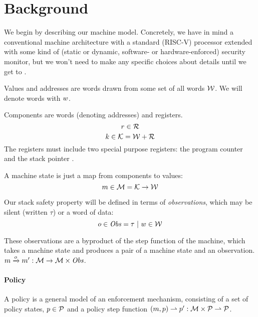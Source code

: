 \documentclass[acmsmall,review,anonymous]{acmart}\settopmatter{printfolios=true,printccs=false,printacmref=false}
\begin{document}
\section{Background}
\label{sec:prelim}

We begin by describing our machine model. Concretely, we have in mind a
conventional machine architecture with a standard (RISC-V) processor
extended with some kind of (static or dynamic, software- or
hardware-enforced) security monitor, but we won't need to make any
specific choices about details until we get to .

Values and addresses are words drawn from some set of all words ${\mathcal W}$. We will
denote words with $w$.

Components are words (denoting addresses) and registers.
%
    \[r \in {\mathcal R}\]
    \[k \in {\mathcal K} = {\mathcal W} + {\mathcal R} \]
%
The registers must include two special purpose registers: the program
counter \PCname and the stack pointer \SP.

A machine state is just a map from components to values:
%
\[m \in {\mathcal M} = {\mathcal K} \rightarrow {\mathcal W}\]


Our stack safety property will be defined in terms of {\em observations}, which may be
silent (written $\tau$) or a word of data:
%
\[o \in \mathit{Obs} = \tau ~ | ~ w \in {\mathcal W}\]

These observations are a byproduct of the step function of the
machine, which takes a machine state and produces a pair of a
machine state and an observation.
%
\(m \xrightarrow{o} m' : {\mathcal M} \rightarrow {\mathcal M} \times \mathit{Obs} \).

\paragraph*{Policy}
    
A policy is a general model of an enforcement mechanism, consisting of
a set of policy states, \(p \in \mathcal{P}\) and a policy step function
\((m, p) \rightharpoonup p' : {\mathcal M} \times \mathcal{P}
\rightharpoonup \mathcal{P}\).

\end{document}
